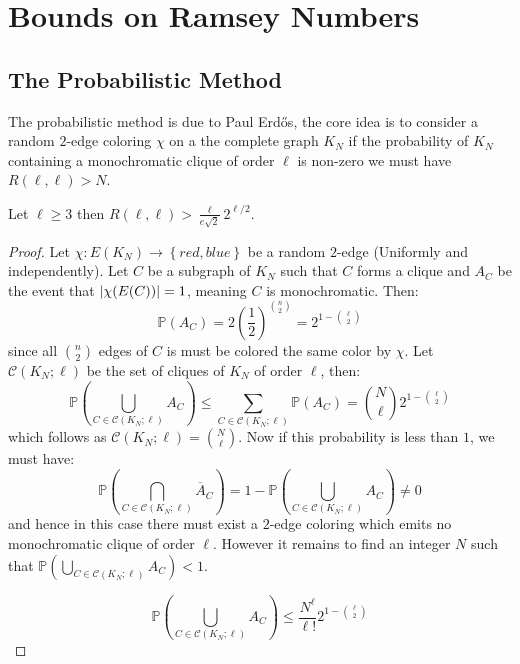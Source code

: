 \section{Bounds on Ramsey Numbers}

\subsection{The Probabilistic Method}
The probabilistic method is due to Paul Erdős, the core idea is to consider a random $2$-edge coloring $\chi$ on a the complete graph $K_{N}$ if the probability of $K_N$ containing a monochromatic clique of order $\ell$ is non-zero we must have $R(\ell, \ell) > N$.


\begin{theorem}
  Let $\ell \geq 3$ then $R(\ell, \ell) > \frac{\ell}{e \sqrt{2}} 2^{\ell / 2}$.
\end{theorem}
\begin{proof}
  Let $\chi: E(K_N) \to \left\{red, blue\right\}$ be a random $2$-edge (Uniformly and independently). Let $C$ be a subgraph of $K_N$ such that $C$ forms a clique and $A_C$ be the event that $\left\lvert\chi(E(C))\right\rvert = 1$, meaning $C$ is monochromatic. Then:
  \begin{equation*}
    \mathbb{P}(A_C) = 2 (\frac{1}{2})^{\binom{n}{2}} = 2^{1 - \binom{\ell}{2}}
  \end{equation*}
  since all $\binom{n}{2}$ edges of $C$ is must be colored the same color by $\chi$. Let $\mathcal{C}(K_N;\ell)$ be the set of cliques of $K_N$ of order $\ell$, then:
  \begin{equation*}
    \mathbb{P} \left(\bigcup_{C \in \mathcal{C}(K_{N}; \ell)} A_{C}\right) \leq \sum_{C \in \mathcal{C}(K_N; \ell)} \mathbb{P}(A_{C}) = \binom{N}{\ell} 2^{1 - \binom{\ell}{2}}
  \end{equation*}
  which follows as $\mathcal{C}(K_N; \ell) = \binom{N}{\ell}$. Now if this probability is less than $1$, we must have:
  \begin{equation*}
    \mathbb{P}(\bigcap_{C \in \mathcal{C}(K_N; \ell)} \overline{A}_{C}) = 1 - \mathbb{P} \left(\bigcup_{C \in \mathcal{C}(K_{N}; \ell)} A_{C}\right) \neq 0
  \end{equation*}
  and hence in this case there must exist a $2$-edge coloring which emits no monochromatic clique of order $\ell$. However it remains to find an integer $N$ such that $\mathbb{P} \left(\bigcup_{C \in \mathcal{C}(K_{N}; \ell)} A_{C}\right) < 1$.

  \begin{equation*}
    \mathbb{P} \left(\bigcup_{C \in \mathcal{C}(K_{N}; \ell)} A_{C}\right) \leq \frac{N^{\ell}}{\ell!} 2^{1 - \binom{\ell}{2}}
  \end{equation*}
\end{proof}
